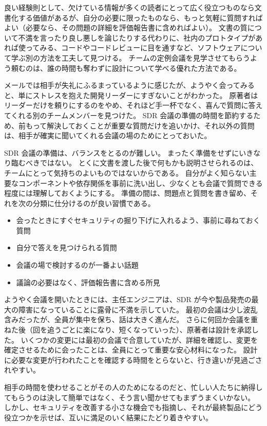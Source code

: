 \documentclass[uplatex]{jsarticle}
\begin{document}
良い経験則として、欠けている情報が多くの読者にとって広く役立つものなら文書化する価値があるが、自分の必要に限ったものなら、もっと気軽に質問すればよい（必要なら、その問題の詳細を評価報告書に含めればよい）。
文書の質について不満を言ったり良し悪しを論じたりする代わりに、社内のプロトタイプがあれば使ってみる、コードやコードレビューに目を通すなど、ソフトウェアについて学ぶ別の方法を工夫して見つける。
チームの定例会議を見学させてもらうよう頼むのは、誰の時間も奪わずに設計について学べる優れた方法である。

メールでは相手が失礼にふるまっているように感じたが、ようやく会ってみると、単にストレスを抱えた開発リーダーにすぎないことがわかった。
原著者はリーダーだけを頼りにするのをやめ、それほど手一杯でなく、喜んで質問に答えてくれる別のチームメンバーを見つけた。
SDR 会議の準備の時間を節約するため、前もって解決しておくことが重要な質問だけを追いかけ、それ以外の質問は、相手が確実に聞いてくれる会議の場のためにとっておいた。

SDR 会議の準備は、バランスをとるのが難しい。
まったく準備をせずにいきなり臨むべきではない。
とくに文書を渡した後で何もかも説明させられるのは、チームにとって気持ちのよいものではないからである。
自分がよく知らない主要なコンポーネントや依存関係を事前に洗い出し、少なくとも会議で質問できる程度には理解しておくようにする。
準備の間は、問題点と質問を書き留め、それを次の分類に仕分けるのが良い習慣である。
\begin{itemize}
\item 会ったときにすぐセキュリティの掘り下げに入れるよう、事前に尋ねておく質問
\item 自分で答えを見つけられる質問
\item 会議の場で検討するのが一番よい話題
\item 議論の必要はなく、評価報告書に含める所見
\end{itemize}

ようやく会議を開いたときには、主任エンジニアは、SDR が今や製品発売の最大の障害になっていることに露骨に不満を示していた。
最初の会議は少し波乱含みだったが、全員が集中を保ち、話は大きく進んだ。
さらに何回か会議を重ねた後（回を追うごとに楽になり、短くなっていった）、原著者は設計を承認した。
いくつかの変更には最初の会議で合意していたが、詳細を確認し、変更を確定させるために会ったことは、全員にとって重要な安心材料になった。
設計に必要な変更が行われたことを確認する時間をとらないと、行き違いが見過ごされやすい。

相手の時間を使わせることがその人のためになるのだと、忙しい人たちに納得してもらうのは決して簡単ではなく、そう言い聞かせてもまずうまくいかない。
しかし、セキュリティを改善する小さな機会でも指摘し、それが最終製品にどう役立つかを示せば、互いに満足のいく結果にたどり着きやすい。
\end{document}
